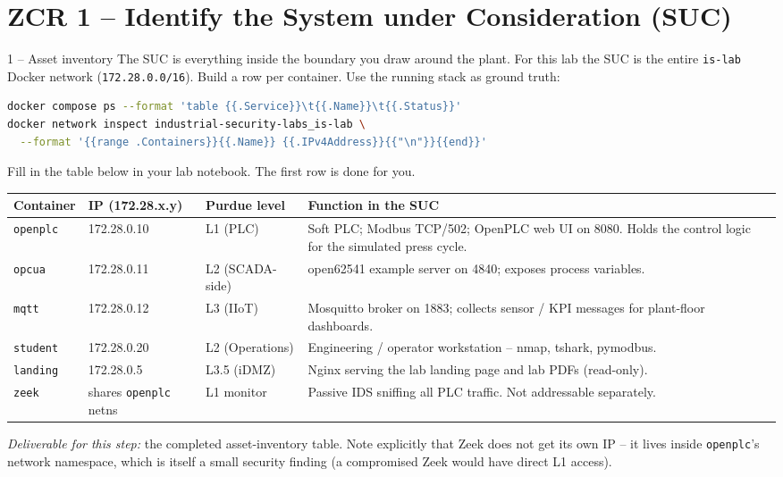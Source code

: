 \documentclass[11pt,a4paper]{article}
\begin{document}
\section*{ZCR 1 -- Identify the System under Consideration (SUC)}

\begin{stepbox}{1 -- Asset inventory}
The SUC is everything inside the boundary you draw around the plant. For this lab the SUC is the entire \texttt{is-lab} Docker network (\texttt{172.28.0.0/16}). Build a row per container. Use the running stack as ground truth:
\begin{lstlisting}[language=bash]
docker compose ps --format 'table {{.Service}}\t{{.Name}}\t{{.Status}}'
docker network inspect industrial-security-labs_is-lab \
  --format '{{range .Containers}}{{.Name}} {{.IPv4Address}}{{"\n"}}{{end}}'
\end{lstlisting}
Fill in the table below in your lab notebook. The first row is done for you.
\medskip

\noindent\small
\begin{tabular}{@{}p{} p{} p{} p{}@{}}
\toprule
\textbf{Container} & \textbf{IP (172.28.x.y)} & \textbf{Purdue level} & \textbf{Function in the SUC} \\
\midrule
\texttt{openplc}   & 172.28.0.10 & L1 (PLC) & Soft PLC; Modbus TCP/502; OpenPLC web UI on 8080. Holds the control logic for the simulated press cycle. \\
\texttt{opcua}     & 172.28.0.11 & L2 (SCADA-side) & open62541 example server on 4840; exposes process variables. \\
\texttt{mqtt}      & 172.28.0.12 & L3 (IIoT) & Mosquitto broker on 1883; collects sensor / KPI messages for plant-floor dashboards. \\
\texttt{student}   & 172.28.0.20 & L2 (Operations) & Engineering / operator workstation -- nmap, tshark, pymodbus. \\
\texttt{landing}   & 172.28.0.5  & L3.5 (iDMZ) & Nginx serving the lab landing page and lab PDFs (read-only). \\
\texttt{zeek}      & shares \texttt{openplc} netns & L1 monitor & Passive IDS sniffing all PLC traffic. Not addressable separately. \\
\bottomrule
\end{tabular}
\medskip

\emph{Deliverable for this step:} the completed asset-inventory table. Note explicitly that Zeek does not get its own IP -- it lives inside \texttt{openplc}'s network namespace, which is itself a small security finding (a compromised Zeek would have direct L1 access).
\end{stepbox}
\end{document}
